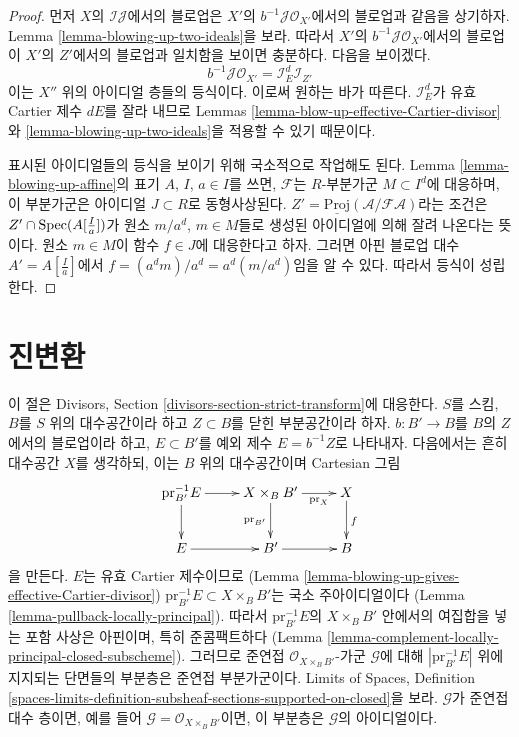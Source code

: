 \begin{proof}
\medskip\noindent
먼저 $X$의 $\mathcal{I}\mathcal{J}$에서의 블로업은
$X'$의 $b^{-1}\mathcal{J} \mathcal{O}_{X'}$에서의 블로업과 같음을
상기하자. Lemma \ref{lemma-blowing-up-two-ideals}을 보라.
따라서 $X'$의 $b^{-1}\mathcal{J} \mathcal{O}_{X'}$에서의 블로업이
$X'$의 $Z'$에서의 블로업과 일치함을 보이면 충분하다. 다음을 보이겠다.
$$
b^{-1}\mathcal{J} \mathcal{O}_{X'} = \mathcal{I}_E^d \mathcal{I}_{Z'}
$$
이는 $X''$ 위의 아이디얼 층들의 등식이다. 이로써 원하는 바가 따른다.
$\mathcal{I}_E^d$가 유효 Cartier 제수 $dE$를 잘라 내므로 Lemmas
\ref{lemma-blow-up-effective-Cartier-divisor}와
\ref{lemma-blowing-up-two-ideals}을 적용할 수 있기 때문이다.

\medskip\noindent
표시된 아이디얼들의 등식을 보이기 위해 국소적으로 작업해도 된다.
Lemma \ref{lemma-blowing-up-affine}의 표기 $A$, $I$, $a \in I$를 쓰면,
$\mathcal{F}$는 $R$-부분가군 $M \subset I^d$에 대응하며, 이 부분가군은
아이디얼 $J \subset R$로 동형사상된다.
$Z' = \underline{\text{Proj}}(\mathcal{A}/\mathcal{F}\mathcal{A})$라는
조건은 $Z' \cap \mathop{\mathrm{Spec}}(A[\frac{I}{a}])$가 원소
$m/a^d$, $m \in M$들로 생성된 아이디얼에 의해 잘려 나온다는 뜻이다.
원소 $m \in M$이 함수 $f \in J$에 대응한다고 하자. 그러면 아핀 블로업
대수 $A' = A[\frac{I}{a}]$에서
$f = (a^dm)/a^d = a^d (m/a^d)$임을 알 수 있다. 따라서 등식이 성립한다.
\end{proof}

\section{진변환}
\label{section-strict-transform}

\noindent
이 절은 Divisors, Section \ref{divisors-section-strict-transform}에 대응한다.
$S$를 스킴, $B$를 $S$ 위의 대수공간이라 하고
$Z \subset B$를 닫힌 부분공간이라 하자.
$b : B' \to B$를 $B$의 $Z$에서의 블로업이라 하고, $E \subset B'$를
예외 제수 $E = b^{-1}Z$로 나타내자. 다음에서는 흔히 대수공간 $X$를
생각하되, 이는 $B$ 위의 대수공간이며 Cartesian 그림
$$
\xymatrix{
\text{pr}_{B'}^{-1}E \ar[r] \ar[d] &
X \times_B B' \ar[r]_-{\text{pr}_X} \ar[d]_{\text{pr}_{B'}} &
X \ar[d]^f \\
E \ar[r] & B' \ar[r] & B
}
$$
을 만든다. $E$는 유효 Cartier 제수이므로
(Lemma \ref{lemma-blowing-up-gives-effective-Cartier-divisor})
$\text{pr}_{B'}^{-1}E \subset X \times_B B'$는 국소 주아이디얼이다
(Lemma \ref{lemma-pullback-locally-principal}).
따라서 $\text{pr}_{B'}^{-1}E$의 $X \times_B B'$ 안에서의 여집합을 넣는
포함 사상은 아핀이며, 특히 준콤팩트하다
(Lemma \ref{lemma-complement-locally-principal-closed-subscheme}).
그러므로 준연접 $\mathcal{O}_{X \times_B B'}$-가군 $\mathcal{G}$에 대해
$|\text{pr}_{B'}^{-1}E|$ 위에 지지되는 단면들의 부분층은 준연접
부분가군이다. Limits of Spaces, Definition
\ref{spaces-limits-definition-subsheaf-sections-supported-on-closed}을 보라.
$\mathcal{G}$가 준연접 대수 층이면, 예를 들어
$\mathcal{G} = \mathcal{O}_{X \times_B B'}$이면, 이 부분층은
$\mathcal{G}$의 아이디얼이다.

